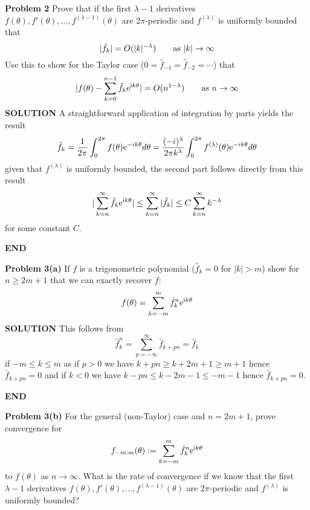 \documentclass[12pt,a4paper]{article}
\begin{document}
\textbf{Problem 2} Prove that if the first $\ensuremath{\lambda}-1$ derivatives $f(\ensuremath{\theta}), f'(\ensuremath{\theta}), \ensuremath{\ldots}, f^{(\ensuremath{\lambda}-1)}(\ensuremath{\theta})$ are 2\ensuremath{\pi}-periodic and $f^{(\ensuremath{\lambda})}$ is uniformly bounded  that
\[
|\hat f_k| = O(|k|^{-\ensuremath{\lambda}})\qquad \hbox{as $|k| \ensuremath{\rightarrow} \ensuremath{\infty}$}
\]
Use this to show for the Taylor case ($0 = \hat f_{-1} = \hat f_{-2} = \ensuremath{\cdots}$) that
\[
|f(\ensuremath{\theta}) - \ensuremath{\sum}_{k=0}^{n-1} \hat f_k {\rm e}^{{\rm i}k\ensuremath{\theta}}| = O(n^{1-\ensuremath{\lambda}})\qquad \hbox{as $n \ensuremath{\rightarrow} \ensuremath{\infty}$}
\]
\textbf{SOLUTION} A straightforward application of integration by parts yields the result
\[
\hat f_k = \frac{1}{2\ensuremath{\pi}} \int^{2\ensuremath{\pi}}_{0} f(\ensuremath{\theta}) {\rm e}^{-ik\ensuremath{\theta}} d\ensuremath{\theta} = \frac{(-i)^\ensuremath{\lambda}}{2\ensuremath{\pi} k^{\ensuremath{\lambda}}} \int^{2\ensuremath{\pi}}_{0} f^{(\ensuremath{\lambda})}(\ensuremath{\theta}) {\rm e}^{-ik\ensuremath{\theta}} d\ensuremath{\theta}
\]
given that $f^{(\ensuremath{\lambda})}$ is uniformly bounded, the second part follows directly from this result
\[
|\ensuremath{\sum}_{k=n}^{\ensuremath{\infty}} \hat f_k {\rm e}^{{\rm i}k\ensuremath{\theta}}| \ensuremath{\leq} \ensuremath{\sum}_{k=n}^{\ensuremath{\infty}} |\hat f_k | \ensuremath{\leq} C \ensuremath{\sum}_{k=n}^{\ensuremath{\infty}} k^{-\ensuremath{\lambda}}
\]
for some constant $C$.

\textbf{END}

\textbf{Problem 3(a)} If $f$ is a trigonometric polynomial  ($\hat f_k = 0$ for $|k| > m$) show for $n \ensuremath{\geq} 2m+1$ that we can exactly recover $f$:
\[
f(\ensuremath{\theta}) = \ensuremath{\sum}_{k=-m}^m \hat f_k^n {\rm e}^{{\rm i} k \ensuremath{\theta}}
\]
\textbf{SOLUTION} This follows from
\[
\hat f_k^n = \ensuremath{\sum}_{p=-\ensuremath{\infty}}^\ensuremath{\infty} \hat f_{k+pn} = \hat f_k
\]
if $-m \ensuremath{\leq} k \ensuremath{\leq} m$ as if $p > 0$ we have $k + p n \ensuremath{\geq} k + 2m+1 \ensuremath{\geq} m+1$ hence $\hat f_{k+pn} = 0$ and if $k < 0$ we have $k - pn \ensuremath{\leq} k -2m-1 \ensuremath{\leq} -m-1$ hence $\hat f_{k+pn} = 0$.

\textbf{END}

\textbf{Problem 3(b)} For the general (non-Taylor) case and $n = 2m+1$, prove convergence for
\[
f_{-m:m}(\ensuremath{\theta}) := \ensuremath{\sum}_{k=-m}^m \hat f_k^n {\rm e}^{{\rm i} k \ensuremath{\theta}}
\]
to $f(\ensuremath{\theta})$ as $n \ensuremath{\rightarrow} \ensuremath{\infty}$. What is the rate of convergence if we know that the first $\ensuremath{\lambda}-1$ derivatives $f(\ensuremath{\theta}), f'(\ensuremath{\theta}), \ensuremath{\ldots}, f^{(\ensuremath{\lambda}-1)}(\ensuremath{\theta})$ are 2\ensuremath{\pi}-periodic and $f^{(\ensuremath{\lambda})}$ is uniformly bounded?
\end{document}
